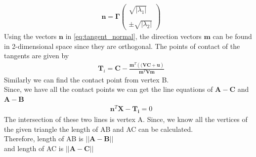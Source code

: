 \documentclass[a4paper,12pt,twocolumn]{article}
\providecommand{\abs}[1]{\left\vert#1\right\vert}
\let\vec\mathbf
\newcommand{\myvec}[1]{\ensuremath{\begin{pmatrix}#1\end{pmatrix}}}
\providecommand{\brak}[1]{\ensuremath{\left((#1\right)}}
\begin{document}
\begin{align}
	\label{eq:tangent_normal}
	&\vec{n} = \vec{\Gamma}\myvec{\sqrt{\abs{\lambda_1}} \\\\ \pm\sqrt{\abs{\lambda_2}}}
\end{align}
Using the vectors $\vec{n}$ in \eqref{eq:tangent_normal}, the direction vectors $\vec{m}$ can be found in 2-dimensional space since they are orthogonal. The points of contact of the tangents are given by
\begin{align*}
	&\vec{T}_i = \vec{C} - \frac{\vec{m}^T\brak{\vec{VC}+\vec{u}}}{\vec{m}^T\vec{V}\vec{m}}
\end{align*}
Similarly we can find the contact point from vertex B.\\
Since, we have all the contact points we can get the line equations of $\vec{A-C}$ and $\vec{A-B}$
\begin{align*}
	&\vec{n}^T\vec{X-T_i}= 0
\end{align*}
The intersection of these two lines is vertex A. Since, we know all the vertices of the given triangle the length of AB and AC can be calculated.\\
Therefore, length of AB is $\vec{||A-B||}$\\
and length of AC is $\vec{||A-C||}$
\end{document}
